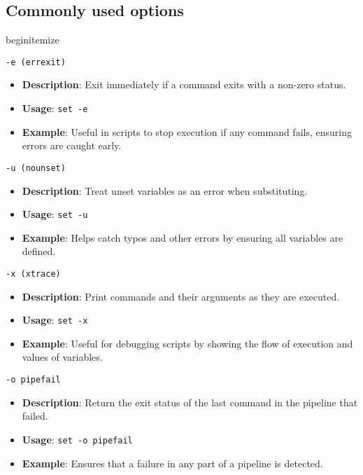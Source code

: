 \documentclass{report}
\begin{document}
    \bigbreak \noindent 
    \subsection{Commonly used options}
    begin{itemize}
\item \texttt{-e (errexit)}
    \begin{itemize}
        \item \textbf{Description}: Exit immediately if a command exits with a non-zero status.
        \item \textbf{Usage}: \texttt{set -e}
        \item \textbf{Example}: Useful in scripts to stop execution if any command fails, ensuring errors are caught early.
    \end{itemize}

\item \texttt{-u (nounset)}
    \begin{itemize}
        \item \textbf{Description}: Treat unset variables as an error when substituting.
        \item \textbf{Usage}: \texttt{set -u}
        \item \textbf{Example}: Helps catch typos and other errors by ensuring all variables are defined.
    \end{itemize}

\item \texttt{-x (xtrace)}
    \begin{itemize}
        \item \textbf{Description}: Print commands and their arguments as they are executed.
        \item \textbf{Usage}: \texttt{set -x}
        \item \textbf{Example}: Useful for debugging scripts by showing the flow of execution and values of variables.
    \end{itemize}

\item \texttt{-o pipefail}
    \begin{itemize}
        \item \textbf{Description}: Return the exit status of the last command in the pipeline that failed.
        \item \textbf{Usage}: \texttt{set -o pipefail}
        \item \textbf{Example}: Ensures that a failure in any part of a pipeline is detected.
    \end{itemize}
\end{document}
